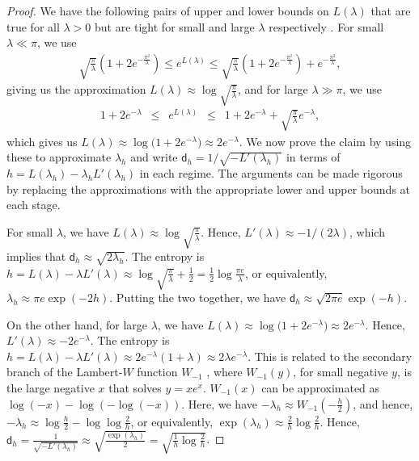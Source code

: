 \documentclass[11pt]{article}
\newcommand{\dist}{\mathsf{d}}
\begin{document}
	\begin{proof}[Proof]
		We have the following pairs of upper and lower bounds on $L(\lambda)$ that are true for all $\lambda > 0$ but are tight for small and large $\lambda$ respectively \cite{stephens2017gaussian,canonne2020discrete}.  
		For small $\lambda \ll \pi$, we use
		\begin{align*}
			\sqrt{\tfrac{\pi}{\lambda}}\left(1 + 2e^{-\frac{\pi^2}{\lambda}}\right)   \leq  e^{L(\lambda)} \leq \sqrt{\tfrac{\pi}{\lambda}}\left(1 + 2e^{-\frac{\pi^2}{\lambda}}\right) + e^{-\frac{\pi^2}{\lambda}},
		\end{align*}
		giving us the approximation $L(\lambda) \approx \log\sqrt{\frac{\pi}{\lambda}}$,
		and for large $\lambda \gg \pi$, we use
		\begin{align*}
			1 + 2e^{-\lambda} \enspace \leq \enspace e^{L(\lambda)} \enspace \leq \enspace  1 + 2e^{-\lambda} + \sqrt{\tfrac{\pi}{\lambda}}e^{-\lambda},
		\end{align*}
		which gives us $L(\lambda) \approx \log\big(1 + 2e^{-\lambda}\big) \approx 2 e^{-\lambda}$.
		We now prove the claim by using these to approximate $\lambda_h$ and write $\dist_h = 1/\sqrt{-L'(\lambda_h)}$ in terms of $h = L(\lambda_h) - \lambda_h L'(\lambda_h)$ in each regime. The arguments can be made rigorous by replacing the approximations with the appropriate lower and upper bounds at each stage.
		
		For small $\lambda$, we have $L(\lambda) \approx \log\sqrt{\frac{\pi}{\lambda}}$. Hence, $L'(\lambda) \approx -1/(2\lambda)$, which implies that $\dist_h \approx \sqrt{2\lambda_h}$. The entropy is $h = L(\lambda)-\lambda L'(\lambda) \approx \log\sqrt{\frac{\pi}{\lambda}} + \frac12 = \frac12\log\frac{\pi e}{\lambda}$, or equivalently, $\lambda_h \approx \pi e \exp(-2 h)$. Putting the two together, we have $\dist_h \approx \sqrt{2\pi e} \exp(-h)$.
		
		On the other hand, for large $\lambda$, we have $L(\lambda) \approx \log\big(1 + 2e^{-\lambda}\big) \approx 2 e^{-\lambda}$.  Hence, $L'(\lambda) \approx -2 e^{-\lambda}$. The entropy is $h = L(\lambda) - \lambda L'(\lambda) \approx 2 e^{-\lambda} ( 1+\lambda) \approx 2 \lambda e^{-\lambda}$. This is related to the secondary branch of the Lambert-$W$ function $W_{-1}$ \cite{corless1996lambert}, where $W_{-1}(y)$, for small negative $y$, is the large negative $x$ that solves $y = x e^x$. $W_{-1}(x)$ can be approximated as $\log(-x)-\log(-\log(-x))$. Here, we have $-\lambda_h \approx W_{-1}(-\frac{h}{2})$, and hence, $-\lambda_h \approx \log\frac{h}{2} - \log \log \frac{2}{h}$, or equivalently, $\exp(\lambda_h) \approx \frac{2}h\log\frac{2}h$. Hence, $\dist_h = \frac{1}{\sqrt{-L'(\lambda_h)}} \approx \sqrt{\frac{\exp(\lambda_h)}2} = \sqrt{\frac1h\log\frac{2}h}$. 
	\end{proof}
	
\end{document}
